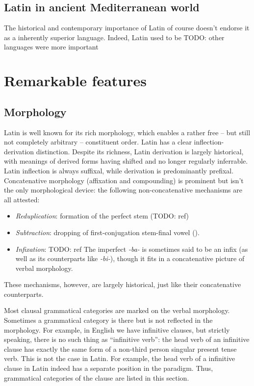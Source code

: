 \documentclass[a4paper, oneside]{report}
\newcommand{\corpus}[1]{\emph{#1}}
\begin{document}
\subsection{Latin in ancient Mediterranean world}

The historical and contemporary importance of Latin 
of course doesn't endorse it as a inherently superior language. 
Indeed, Latin used to be TODO: other languages were more important



\section{Remarkable features}

\subsection{Morphology}

Latin is well known for its rich morphology,
which enables a rather free -- but still not completely arbitrary -- constituent order.
Latin has a clear inflection-derivation distinction.
Despite its richness, 
Latin derivation is largely historical,
with meanings of derived forms 
having shifted and no longer regularly inferrable.
Latin inflection is always suffixal,
while derivation is predominantly prefixal.
Concatenative morphology (affixation and compounding) 
is prominent but isn't the only morphological device:
the following non-concatenative mechanisms are all attested:
\begin{itemize}
    \item \emph{Reduplication}: formation of the perfect stem (TODO: ref)
    \item \emph{Subtraction}: dropping of first-conjugation stem-final vowel ().
    \item \emph{Infixation}:   TODO: ref 
    The imperfect \corpus{-ba-} is sometimes said to be an infix 
    (as well as its counterparts like \corpus{-bi-}),
    though it fits in a concatenative picture of verbal morphology.
\end{itemize}
These mechanisms, however, are largely historical,
just like their concatenative counterparts.

Most clausal grammatical categories are marked on the verbal morphology.
Sometimes a grammatical category is there but is not reflected in the morphology.
For example, in English we have infinitive clauses,
but strictly speaking, there is no such thing as ``infinitive verb'':
the head verb of an infinitive clause 
has exactly the same form of a non-third person singular present tense verb.
This is not the case in Latin.
For example, the head verb of a infinitive clause in Latin 
indeed has a separate position in the paradigm.
Thus, grammatical categories of the clause are listed in this section.
\end{document}
